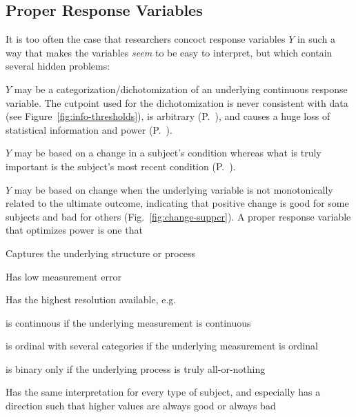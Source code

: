 \subsection{Proper Response Variables}\label{overview-yproper}
It is too often the case that researchers concoct response variables $Y$
in such a way that makes the variables \emph{seem} to be easy to
interpret, but which contain several hidden problems:
\bi
\item $Y$ may be a categorization/dichotomization of an underlying
  continuous response variable.  The cutpoint used for the
  dichotomization is never consistent with data (see
  Figure~\ref{fig:info-thresholds}), 
  is arbitrary (P.~\pageref{pg:info-gia14opt}), and causes a huge loss of
  statistical information and power (P.~\pageref{pg:info-fed09con}).
\item $Y$ may be based on a change in a subject's condition whereas
  what is truly important is the subject's most recent condition
  (P.~\pageref{pg:change-anova}).
\item $Y$ may be based on change when the underlying variable is not
  monotonically related to the ultimate outcome, indicating that
  positive change is good for some subjects and bad for others
  (Fig.~\ref{fig:change-suppcr}).
\ei
A proper response variable that optimizes power is one that
\bi
\item Captures the underlying structure or process
\item Has low measurement error
\item Has the highest resolution available, e.g.
 \bi
 \item is continuous if the underlying measurement is continuous
 \item is ordinal with several categories if the underlying
   measurement is ordinal
 \item is binary only if the underlying process is truly
   all-or-nothing
 \ei
\item Has the same interpretation for every type of subject, and
  especially has a direction such that higher values are always good
  or always bad
\ei

